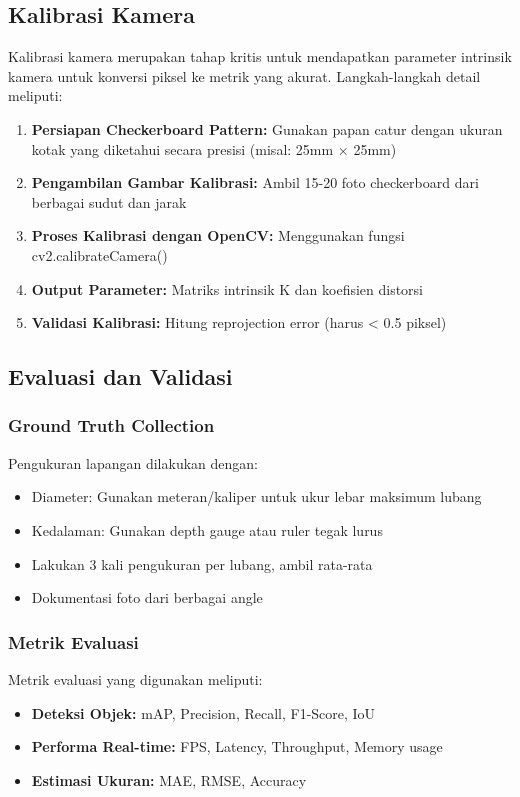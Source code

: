\documentclass[12pt,a4paper]{article}
\begin{document}
\subsection{Kalibrasi Kamera}

Kalibrasi kamera merupakan tahap kritis untuk mendapatkan parameter intrinsik kamera untuk konversi piksel ke metrik yang akurat. Langkah-langkah detail meliputi:

\begin{enumerate}
    \item \textbf{Persiapan Checkerboard Pattern:} Gunakan papan catur dengan ukuran kotak yang diketahui secara presisi (misal: 25mm × 25mm)
    \item \textbf{Pengambilan Gambar Kalibrasi:} Ambil 15-20 foto checkerboard dari berbagai sudut dan jarak
    \item \textbf{Proses Kalibrasi dengan OpenCV:} Menggunakan fungsi cv2.calibrateCamera()
    \item \textbf{Output Parameter:} Matriks intrinsik K dan koefisien distorsi
    \item \textbf{Validasi Kalibrasi:} Hitung reprojection error (harus < 0.5 piksel)
\end{enumerate}

\subsection{Evaluasi dan Validasi}

\subsubsection{Ground Truth Collection}
Pengukuran lapangan dilakukan dengan:
\begin{itemize}
    \item Diameter: Gunakan meteran/kaliper untuk ukur lebar maksimum lubang
    \item Kedalaman: Gunakan depth gauge atau ruler tegak lurus
    \item Lakukan 3 kali pengukuran per lubang, ambil rata-rata
    \item Dokumentasi foto dari berbagai angle
\end{itemize}

\subsubsection{Metrik Evaluasi}
Metrik evaluasi yang digunakan meliputi:
\begin{itemize}
    \item \textbf{Deteksi Objek:} mAP, Precision, Recall, F1-Score, IoU
    \item \textbf{Performa Real-time:} FPS, Latency, Throughput, Memory usage
    \item \textbf{Estimasi Ukuran:} MAE, RMSE, Accuracy
\end{itemize}
\end{document}
